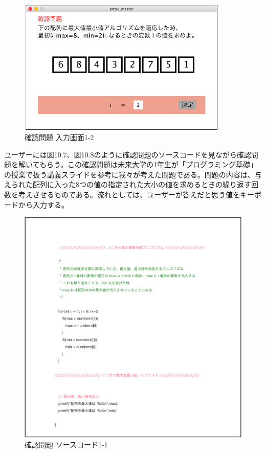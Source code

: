 \documentclass[openany,11pt,papersize]{jsbook}
\begin{document}
\begin{figure}[H]
\begin{center}
\includegraphics[width=10cm, bb=0 0 647 422]{img/10thParagraph/kakuninmondai_02.png}
\end{center}
\caption{確認問題 入力画面1-2}
\end{figure}

ユーザーには図10.7、図10.8のように確認問題のソースコードを見ながら確認問題を解いてもらう。この確認問題は未来大学の1年生が「プログラミング基礎」の授業で扱う講義スライドを参考に我々が考えた問題である。問題の内容は、与えられた配列に入った8つの値の指定された大小の値を求めるときの繰り返す回数を考えさせるものである。流れとしては、ユーザーが答えだと思う値をキーボードから入力する。

\begin{figure}[H]
\begin{center}
\includegraphics[width=14cm, bb=0 0 2549 2594]{img/10thParagraph/kakuninmondai_03.png}
\end{center}
\caption{確認問題 ソースコード1-1}
\end{figure}
\end{document}
